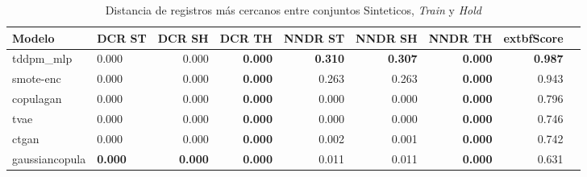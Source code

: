 \begin{table}[H]
\centering
\caption{Distancia de registros más cercanos entre conjuntos Sinteticos, \emph{Train} y \emph{Hold}}
\label{table-dcr-economicos-b-2}
\begin{tabular}{|l|l|r|r|r|r|r|r|r|}
\hline
\rowcolor[gray]{0.8}
Modelo & DCR ST & DCR SH & DCR TH & NNDR ST & NNDR SH & NNDR TH & 	extbf{Score} \\
\hline tddpm\_mlp & 0.000 & 0.000 & \cellcolor[rgb]{0.9, 0.54, 0.52} \bfseries 0.000 & \bfseries 0.310 & \bfseries 0.307 & \cellcolor[rgb]{0.9, 0.54, 0.52} \bfseries 0.000 & \bfseries 0.987 \\
\hline smote-enc & 0.000 & 0.000 & \cellcolor[rgb]{0.9, 0.54, 0.52} \bfseries 0.000 & 0.263 & 0.263 & \cellcolor[rgb]{0.9, 0.54, 0.52} \bfseries 0.000 & 0.943 \\
\hline copulagan & \cellcolor[rgb]{0.9, 0.54, 0.52} 0.000 & \cellcolor[rgb]{0.9, 0.54, 0.52} 0.000 & \cellcolor[rgb]{0.9, 0.54, 0.52} \bfseries 0.000 & \cellcolor[rgb]{0.9, 0.54, 0.52} 0.000 & \cellcolor[rgb]{0.9, 0.54, 0.52} 0.000 & \cellcolor[rgb]{0.9, 0.54, 0.52} \bfseries 0.000 & 0.796 \\
\hline tvae & 0.000 & 0.000 & \cellcolor[rgb]{0.9, 0.54, 0.52} \bfseries 0.000 & 0.000 & 0.000 & \cellcolor[rgb]{0.9, 0.54, 0.52} \bfseries 0.000 & 0.746 \\
\hline ctgan & 0.000 & 0.000 & \cellcolor[rgb]{0.9, 0.54, 0.52} \bfseries 0.000 & 0.002 & 0.001 & \cellcolor[rgb]{0.9, 0.54, 0.52} \bfseries 0.000 & 0.742 \\
\hline gaussiancopula & \bfseries 0.000 & \bfseries 0.000 & \cellcolor[rgb]{0.9, 0.54, 0.52} \bfseries 0.000 & 0.011 & 0.011 & \cellcolor[rgb]{0.9, 0.54, 0.52} \bfseries 0.000 & 0.631 \\
\hline
\end{tabular}
\end{table}
